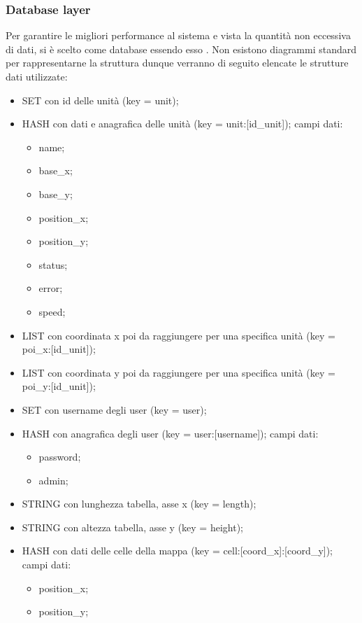 \subsubsection{Database layer}
Per garantire le migliori performance al sistema e vista la quantità non eccessiva di dati, si è scelto  come database essendo esso . Non esistono diagrammi standard per rappresentarne la struttura dunque verranno di seguito elencate le strutture dati utilizzate:
\begin{itemize}
    \item SET con id delle unità (key = unit);
    \item HASH con dati e anagrafica delle unità (key = unit:[id\_unit]); campi dati:
    \begin{itemize}
        \item name;
        \item base\_x;
        \item base\_y;
        \item position\_x;
        \item position\_y;
        \item status;
        \item error;
        \item speed;
    \end{itemize}
    \item LIST con coordinata x poi da raggiungere per una specifica unità (key = poi\_x:[id\_unit]);
    \item LIST con coordinata y poi da raggiungere per una specifica unità (key = poi\_y:[id\_unit]);
    \item SET con username degli user (key = user);
    \item HASH con anagrafica degli user (key = user:[username]); campi dati:
    \begin{itemize}
        \item password;
        \item admin;
    \end{itemize}
    \item STRING con lunghezza tabella, asse x (key = length);
    \item STRING con altezza tabella, asse y (key = height);
    \item HASH con dati delle celle della mappa (key = cell:[coord\_x]:[coord\_y]); campi dati:
    \begin{itemize}
        \item position\_x;
        \item position\_y;

\end{itemize}
\end{itemize}
